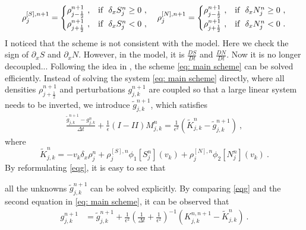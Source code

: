 \documentclass[11pt,twoside]{article}
\theoremstyle{nonumberplain}
\begin{document}
{
\[
\rho^{[S],n+1}_{j}=\begin{cases}
     \rho^{n+1}_{j-\frac{1}{2}}\ ,  &\textnormal{if}\ \  \delta_x S_{j}^n\geq 0\ ,\\
    \rho^{n+1}_{j+\frac{1}{2}}\ , &\textnormal{if}\ \ \delta_x S_{j}^n< 0\ ,
\end{cases}
\quad \rho^{[N],n+1}_{j}=\begin{cases}
     \rho^{n+1}_{j-\frac{1}{2}}\ , & \textnormal{if}\ \  \delta_x N_{j}^n\geq 0\ ,\\
    \rho^{n+1}_{j+\frac{1}{2}}\ , & \textnormal{if}\ \ \delta_x N_{j}^n< 0\ .
    \end{cases}
\]
{\color{red} I noticed that the scheme is not consistent with the model. Here we check the sign of $\partial_x S$ and $\partial_x N$. However, in the model, it is $\frac{DS}{Dt}$ and $\frac{DN}{Dt}$. 
Now it is no longer decoupled...}
Following the idea in \cite{lemou2008new}, the scheme \eqref{eq: main scheme} can be solved efficiently. Instead of solving the system \eqref{eq: main scheme} directly, where all densities $\rho_{j+\frac{1}{2}}^{n+1}$ and perturbations $g_{j,k}^{n+1}$ are coupled so that a large linear system needs to be inverted, we introduce $\tilde{g}_{j,k}^{n+1}$, which satisfies
\begin{eqnarray}\label{eqg}
    \frac{\tilde{g}_{j,k}^{n+1}-g_{j,k}^n}{\Delta t}+\frac{1}{\epsilon}(I-II)M_{j,k}^n=\frac{1}{\epsilon^2}(\widetilde{K}_{j,k}^{n}-\tilde{g}_{j,k}^{n+1})\ ,
\end{eqnarray}
where
$$
\widetilde{K}_{j,k}^{n}=-v_k\delta_x\rho_{j}^{n}+\rho^{[S],n}_{j}\phi_1[S_{j}^n](v_k)+\rho^{[N],n}_{j}\phi_2[N_{j}^n](v_k)\ .
$$
By reformulating \eqref{eqg}, it is easy to see that

 all the unknowns $\tilde{g}_{j,k}^{n+1}$ can be solved explicitly. By comparing \eqref{eqg} and the second equation in \eqref{eq: main scheme}, it can be observed that 
\begin{align}\label{g}
    g_{j,k}^{n+1}
    &=\tilde{g}_{j,k}^{n+1}+\frac{1}{\epsilon^2}\left(\frac{1}{\Delta t}+\frac{1}{\epsilon^2}\right)^{-1}\left( K_{j,k}^{n,n+1}-\widetilde{K}_{j,k}^n \right)\ .

\end{align}}
\end{document}
